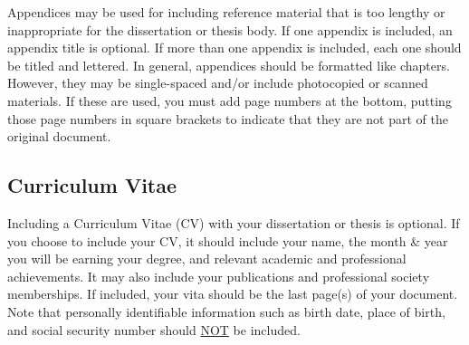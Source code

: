 Appendices may be used for including reference material that is too lengthy or inappropriate for the dissertation or thesis body.
If one appendix is included, an appendix title is optional.
If more than one appendix is included, each one should be titled and lettered.
In general, appendices should be formatted like chapters.
However, they may be single-spaced and/or include photocopied or scanned materials.
If these are used, you must add page numbers at the bottom, putting those page numbers in square brackets to indicate that they are not part of the original document.

\subsection{Curriculum Vitae}

Including a Curriculum Vitae (CV) with your dissertation or thesis is optional.
If you choose to include your CV, it should include your name, the month \& year you will be earning your degree, and relevant academic and professional achievements.
It may also include your publications and professional society memberships.
If included, your vita should be the last page(s) of your document.
Note that personally identifiable information such as birth date, place of birth, and social security number should \underline{NOT} be included.
